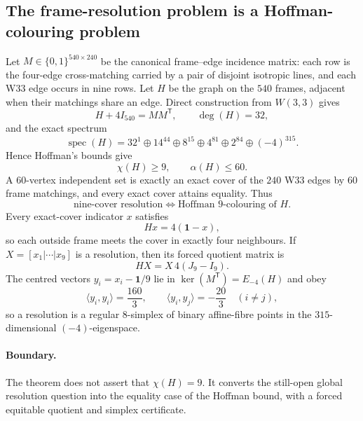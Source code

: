 \providecommand{\spec}{\operatorname{spec}}
\subsection*{The frame-resolution problem is a Hoffman-colouring problem}
Let $M\in\{0,1\}^{540\times240}$ be the canonical frame--edge incidence
matrix: each row is the four-edge cross-matching carried by a pair of disjoint
isotropic lines, and each W33 edge occurs in nine rows.  Let $H$ be the graph on
the $540$ frames, adjacent when their matchings share an edge.  Direct
construction from $W(3,3)$ gives
\[
 H+4I_{540}=MM^{\mathsf T},\qquad \deg(H)=32,
\]
and the exact spectrum
\[
 \spec(H)=32^1\oplus14^{44}\oplus8^{15}\oplus4^{81}
 \oplus2^{84}\oplus(-4)^{315}.
\]
Hence Hoffman's bounds give
\[
 \chi(H)\ge9,\qquad \alpha(H)\le60.
\]
A $60$-vertex independent set is exactly an exact cover of the $240$ W33
edges by $60$ frame matchings, and every exact cover attains equality.  Thus
\[
 \boxed{\text{nine-cover resolution}\iff\text{Hoffman $9$-colouring of }H.}
\]
Every exact-cover indicator $x$ satisfies
\[
 Hx=4(\mathbf1-x),
\]
so each outside frame meets the cover in exactly four neighbours.  If
$X=[x_1|\cdots|x_9]$ is a resolution, then its forced quotient matrix is
\[
 HX=X\,4(J_9-I_9).
\]
The centred vectors $y_i=x_i-\mathbf1/9$ lie in
$\ker(M^{\mathsf T})=E_{-4}(H)$ and obey
\[
 \langle y_i,y_i\rangle=\frac{160}{3},\qquad
 \langle y_i,y_j\rangle=-\frac{20}{3}\quad(i\ne j),
\]
so a resolution is a regular $8$-simplex of binary affine-fibre points in the
$315$-dimensional $(-4)$-eigenspace.

\paragraph{Boundary.}
The theorem does not assert that $\chi(H)=9$.  It converts the still-open global
resolution question into the equality case of the Hoffman bound, with a forced
equitable quotient and simplex certificate.
